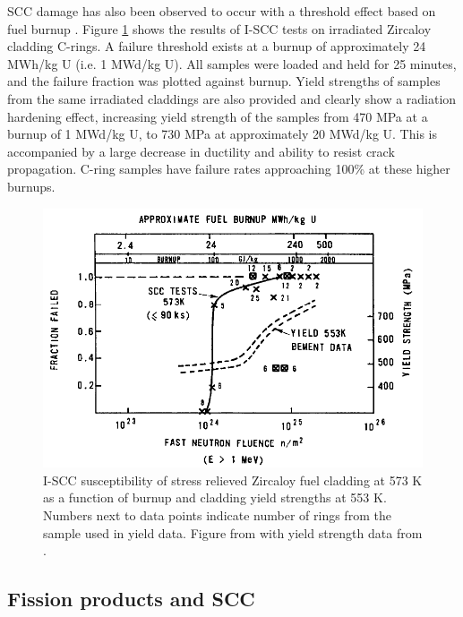 SCC damage has also been observed to occur with a threshold effect based on fuel burnup \cite{Wood1974}. Figure \ref{figure:SCCthreshold} shows the results of I-SCC tests on irradiated Zircaloy cladding C-rings. A failure threshold exists at a burnup of approximately 24 MWh/kg U (i.e. 1 MWd/kg U). All samples were loaded and held for 25 minutes, and the failure fraction was plotted against burnup. Yield strengths of samples from the same irradiated claddings are also provided and clearly show a radiation hardening effect, increasing yield strength of the samples from 470 MPa at a burnup of 1 MWd/kg U, to 730 MPa at approximately 20 MWd/kg U. This is accompanied by a large decrease in ductility and ability to resist crack propagation. C-ring samples have failure rates approaching 100\% at these higher burnups.

\begin{figure}[ht] %
\centering
\includegraphics[width=14.5cm]{images/SCCthreshold.png}
\caption[I-SCC susceptibility of stress relieved Zircaloy fuel cladding at 573 K as a function of burnup and cladding yield strengths at 553 K. Numbers next to data points indicate number of rings from the sample used in yield data.]{I-SCC susceptibility of stress relieved Zircaloy fuel cladding at 573 K as a function of burnup and cladding yield strengths at 553 K. Numbers next to data points indicate number of rings from the sample used in yield data. Figure from \cite{bcoxpelletclad1990} with yield strength data from \cite{Bement1964}.}
\label{figure:SCCthreshold}
\end{figure}

\subsection{Fission products and SCC}


